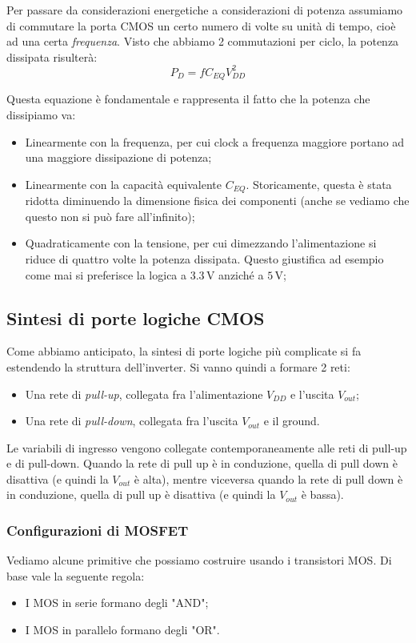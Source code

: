 \documentclass[a4paper,11pt]{article}
\begin{document}
\par\smallskip

Per passare da considerazioni energetiche a considerazioni di potenza assumiamo di commutare la porta CMOS un certo numero di volte su unità di tempo, cioè ad una certa \textit{frequenza}. Visto che abbiamo 2 commutazioni per ciclo, la potenza dissipata risulterà:
$$
P_D = f C_{EQ} V_{DD}^2
$$

Questa equazione è fondamentale e rappresenta il fatto che la potenza che dissipiamo va:
\begin{itemize}
	\item Linearmente con la frequenza, per cui clock a frequenza maggiore portano ad una maggiore dissipazione di potenza;
	\item Linearmente con la capacità equivalente $C_{EQ}$. Storicamente, questa è stata ridotta diminuendo la dimensione fisica dei componenti (anche se vediamo che questo non si può fare all'infinito);
	\item Quadraticamente con la tensione, per cui dimezzando l'alimentazione si riduce di quattro volte la potenza dissipata. Questo giustifica ad esempio come mai si preferisce la logica a $3.3 \, \mathrm{V}$ anziché a $5 \, \mathrm{V}$;
\end{itemize}

\subsection{Sintesi di porte logiche CMOS}
Come abbiamo anticipato, la sintesi di porte logiche più complicate si fa estendendo la struttura dell'inverter. Si vanno quindi a formare 2 reti:
\begin{itemize}
	\item Una rete di \textit{pull-up}, collegata fra l'alimentazione $V_{DD}$ e l'uscita $V_{out}$;
	\item Una rete di \textit{pull-down}, collegata fra l'uscita $V_{out}$ e il ground.
\end{itemize}

Le variabili di ingresso vengono collegate contemporaneamente alle reti di pull-up e di pull-down. Quando la rete di pull up è in conduzione, quella di pull down è disattiva (e quindi la $V_{out}$ è alta), mentre viceversa quando la rete di pull down è in conduzione, quella di pull up è disattiva (e quindi la $V_{out}$ è bassa).

\subsubsection{Configurazioni di MOSFET}
Vediamo alcune primitive che possiamo costruire usando i transistori MOS.
Di base vale la seguente regola:
\begin{itemize}
	\item I MOS in serie formano degli "AND";
	\item I MOS in parallelo formano degli "OR".
\end{itemize}
\end{document}

